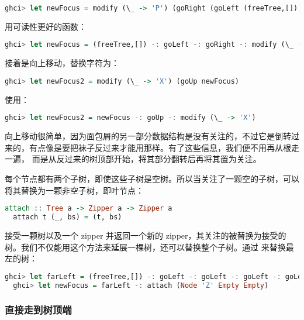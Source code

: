 \documentclass[./main.tex]{subfiles}
\begin{document}
\begin{lstlisting}[language=Haskell]
  ghci> let newFocus = modify (\_ -> 'P') (goRight (goLeft (freeTree,[])))
\end{lstlisting}

用可读性更好的\acode{-:}函数：

\begin{lstlisting}[language=Haskell]
  ghci> let newFocus = (freeTree,[]) -: goLeft -: goRight -: modify (\_ -> 'P')
\end{lstlisting}

接着是向上移动，替换字符为：

\begin{lstlisting}[language=Haskell]
  ghci> let newFocus2 = modify (\_ -> 'X') (goUp newFocus)
\end{lstlisting}

使用\acode{-:}：

\begin{lstlisting}[language=Haskell]
  ghci> let newFocus2 = newFocus -: goUp -: modify (\_ -> 'X')
\end{lstlisting}

向上移动很简单，因为面包屑的另一部分数据结构是没有关注的，不过它是倒转过来的，有点像是要把袜子反过来才能用那样。有了这些信息，我们便不用再从根走一遍，
而是从反过来的树顶部开始，将其部分翻转后再将其置为关注。

每个节点都有两个子树，即使这些子树是空树。所以当关注了一颗空的子树，可以将其替换为一颗非空子树，即叶节点：

\begin{lstlisting}[language=Haskell]
  attach :: Tree a -> Zipper a -> Zipper a
  attach t (_, bs) = (t, bs)
\end{lstlisting}

接受一颗树以及一个 zipper 并返回一个新的 zipper，其关注的被替换为接受的树。我们不仅能用这个方法来延展一棵树，还可以替换整个子树。通过
来替换最左的树：

\begin{lstlisting}[language=Haskell]
  ghci> let farLeft = (freeTree,[]) -: goLeft -: goLeft -: goLeft -: goLeft
  ghci> let newFocus = farLeft -: attach (Node 'Z' Empty Empty)
\end{lstlisting}

\subsubsection*{直接走到树顶端}
\end{document}
